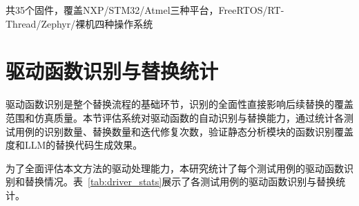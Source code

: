 \begin{table}[H]
\vspace{2pt}

{\scriptsize 共35个固件，覆盖NXP/STM32/Atmel三种平台，FreeRTOS/RT-Thread/Zephyr/裸机四种操作系统}
\end{table}

\section{驱动函数识别与替换统计}
\label{sec:driver_stats}

驱动函数识别是整个替换流程的基础环节，识别的全面性直接影响后续替换的覆盖范围和仿真质量。本节评估系统对驱动函数的自动识别与替换能力，通过统计各测试用例的识别数量、替换数量和迭代修复次数，验证静态分析模块的函数识别覆盖度和LLM的替换代码生成效果。

为了全面评估本文方法的驱动处理能力，本研究统计了每个测试用例的驱动函数识别和替换情况。表~\ref{tab:driver_stats}展示了各测试用例的驱动函数识别与替换统计。

